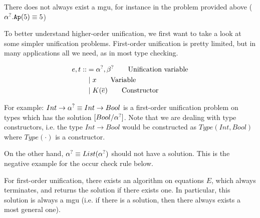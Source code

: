 \documentclass[twoside,12pt,a4paper]{article}
\begin{document}
There does not always exist a mgu, for instance in the problem provided above ($\alpha^?.\texttt{Ap}(5) \equiv 5$) %


To better understand higher-order unification, we first want to take a look at some simpler unification problems.
First-order unification is pretty limited, but in many applications all we need, as in most type checking.

\begin{definition}

\begin{align*}
    e, t ::&= \alpha^?, \beta^? \tag*{Unification variable}\\
    &\;|\; x\tag*{Variable} \\
    &\;|\; K(\overline{e}) \tag*{Constructor}
\end{align*}
\end{definition}

For example: $Int\rightarrow \alpha^? \equiv Int \rightarrow Bool$ is a first-order unification problem on types which has the solution 
$[Bool/\alpha^?]$. 
Note that we are dealing with type constructors, i.e. the type $Int\rightarrow Bool$ would be constructed as $Type(Int, Bool)$ where $Type(\cdot)$ is a constructor.

On the other hand, $\alpha^?\equiv List(\alpha^?)$ should not have a solution. This is the negative example for the occur check rule below.


\begin{theorem}
    For first-order unification, there exists an algorithm on equations $E$, which always terminates, and returns the solution if there exists one. 
    In particular, this solution is always a mgu (i.e. if there is a solution, then there always exists a most general one).
\end{theorem}
\end{document}
